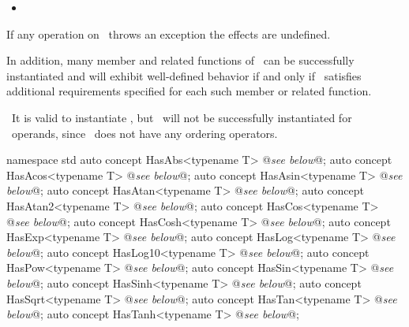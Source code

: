 \documentclass[american,twoside]{book}
\begin{document}
\begin{paras}
\begin{itemize}
\item {}
\end{itemize}

\pnum
If any operation on \ 
throws an exception the effects are undefined.

\pnum
In addition, many member and related functions of
\
can be successfully instantiated
and will exhibit well-defined behavior if and only if
\farg{T}\ satisfies additional requirements specified for each such member
or related function.

\pnum
\enterexample\ 
It is valid to instantiate
,
but
\
will not be successfully instantiated for
\
operands, since
\tcode{complex}\
does not have any ordering operators.
\exitexample\ 

\color{addclr}
\begin{codeblock}
namespace std {
  auto concept HasAbs<typename T> @\textit{see below}@;  
  auto concept HasAcos<typename T> @\textit{see below}@;  
  auto concept HasAsin<typename T> @\textit{see below}@;  
  auto concept HasAtan<typename T> @\textit{see below}@;  
  auto concept HasAtan2<typename T> @\textit{see below}@;  
  auto concept HasCos<typename T> @\textit{see below}@;  
  auto concept HasCosh<typename T> @\textit{see below}@;  
  auto concept HasExp<typename T> @\textit{see below}@;  
  auto concept HasLog<typename T> @\textit{see below}@;  
  auto concept HasLog10<typename T> @\textit{see below}@;  
  auto concept HasPow<typename T> @\textit{see below}@;  
  auto concept HasSin<typename T> @\textit{see below}@;  
  auto concept HasSinh<typename T> @\textit{see below}@;  
  auto concept HasSqrt<typename T> @\textit{see below}@;  
  auto concept HasTan<typename T> @\textit{see below}@;  
  auto concept HasTanh<typename T> @\textit{see below}@;
}
\end{codeblock}



\end{paras}
\end{document}
